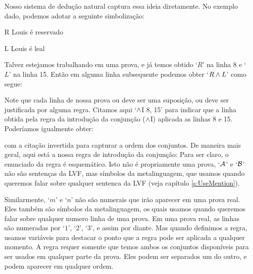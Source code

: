 Nosso sistema de dedu\c c\~ao natural  captura  essa ideia diretamente. No exemplo dado, podemos adotar a seguinte simboliza\c c\~ao:
	\begin{ekey}
		\item[R] Louis \'e reservado
		\item[L] Louis \'e leal
	\end{ekey}
 Talvez estejamos trabalhando em uma prova, e j\'a temos obtido `$R$'  na linha 8 e `$L$' na linha 15. Ent\~ao  em alguma linha subsequente podemos obter  `$R \wedge L$' como segue:
\begin{fitchproof}
	 
\end{fitchproof}

 Note que cada linha de nossa prova  ou deve ser uma suposi\c c\~ao, ou deve ser justificada por alguma regra.    Citamos  aqui   `$\wedge$I 8, 15' para indicar que a linha obtida pela regra da introdu\c c\~ao  da conjun\c c\~ao  ($\wedge$I) aplicada as linhas 8 e 15.  Poder\'iamos igualmente obter:
\begin{fitchproof}
	 
\end{fitchproof}
 
 com a cita\c c\~ao invertida para capturar a ordem  dos  conjuntos. 
De maneira mais geral, aqui est\'a  a nossa regra de introdu\c c\~ao da  conjun\c c\~ao:
Para ser claro, o enunciado da regra \'e esquem\'atico.  Isto n\~ao \'e propriamente uma prova,      `$\mathcal{A}$'  e `$\mathcal{B}$'  n\~ao s\~ao senten\c cas da LVF, mas s\'imbolos da metalinguagem, que usamos quando queremos falar sobre qualquer sentenca da LVF (veja cap\'itulo \ref{s:UseMention}). 

Similarmente,  `$m$' e `$n$' n\~ao s\~ao numerais  que ir\~ao aparecer em uma prova real. Eles tamb\'em s\~ao s\'imbolos da metalinguagem, os quais usamos quando queremos falar sobre qualquer numero linha  de uma prova. Em uma  prova real, as linhas  s\~ao numeradas por `$1$', `$2$', `$3$', e assim por diante.  Mas quando definimos a regra, usamos vari\'aveis   para destacar o ponto que a regra pode ser aplicada a qualquer momento.  A regra requer somente que temos ambos os conjuntos dispon\'iveis para ser usados em qualquer parte da prova. Eles podem ser separados um do outro, e podem aparecer em qualquer ordem.

